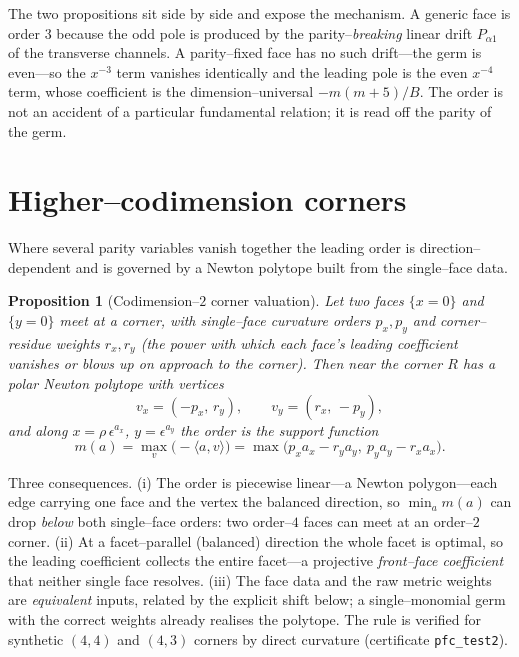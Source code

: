 \documentclass[11pt]{article}
\newtheorem{proposition}[theorem]{Proposition}
\begin{document}
The two propositions sit side by side and expose the mechanism. A generic face is order $3$
because the odd pole is produced by the parity--\emph{breaking} linear drift $P_{\alpha1}$ of
the transverse channels. A parity--fixed face has no such drift---the germ is even---so the
$x^{-3}$ term vanishes identically and the leading pole is the even $x^{-4}$ term, whose
coefficient is the dimension--universal $-m(m+5)/B$. The order is not an accident of a
particular fundamental relation; it is read off the parity of the germ.

\section{Higher--codimension corners}
\label{sec:corner}

Where several parity variables vanish together the leading order is direction--dependent and is
governed by a Newton polytope built from the single--face data.

\begin{proposition}[Codimension--$2$ corner valuation]
\label{prop:corner}
Let two faces $\{x=0\}$ and $\{y=0\}$ meet at a corner, with single--face curvature orders
$p_x,p_y$ and corner--residue weights $r_x,r_y$ (the power with which each face's leading
coefficient vanishes or blows up on approach to the corner). Then near the corner $R$ has a
polar Newton polytope with vertices
\[
v_x=(-p_x,\,r_y),\qquad v_y=(r_x,\,-p_y),
\]
and along $x=\rho\,\epsilon^{a_x}$, $y=\epsilon^{a_y}$ the order is the support function
\[
m(a)=\max_{v}\bigl(-\langle a,v\rangle\bigr)=\max\bigl(p_x a_x-r_y a_y,\ p_y a_y-r_x a_x\bigr).
\]
\end{proposition}

Three consequences. (i) The order is piecewise linear---a Newton polygon---each edge carrying
one face and the vertex the balanced direction, so $\min_a m(a)$ can drop \emph{below} both
single--face orders: two order--$4$ faces can meet at an order--$2$ corner. (ii) At a
facet--parallel (balanced) direction the whole facet is optimal, so the leading coefficient
collects the entire facet---a projective \emph{front--face coefficient} that neither single face
resolves. (iii) The face data and the raw metric weights are \emph{equivalent} inputs, related
by the explicit shift below; a single--monomial germ with the correct weights already realises
the polytope. The rule is verified for synthetic $(4,4)$ and $(4,3)$ corners by direct curvature
(certificate \texttt{pfc\_test2}).
\end{document}
